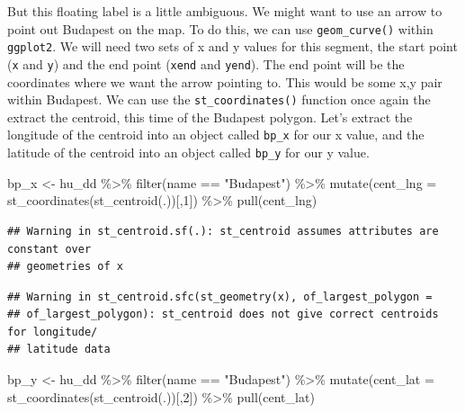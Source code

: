 \documentclass[
]{book}
\newenvironment{Shaded}{\begin{snugshade}}{\end{snugshade}}
\newcommand{\AttributeTok}[1]{\textcolor[rgb]{0.77,0.63,0.00}{#1}}
\newcommand{\DecValTok}[1]{\textcolor[rgb]{0.00,0.00,0.81}{#1}}
\newcommand{\FunctionTok}[1]{\textcolor[rgb]{0.00,0.00,0.00}{#1}}
\newcommand{\NormalTok}[1]{#1}
\newcommand{\OtherTok}[1]{\textcolor[rgb]{0.56,0.35,0.01}{#1}}
\newcommand{\SpecialCharTok}[1]{\textcolor[rgb]{0.00,0.00,0.00}{#1}}
\newcommand{\StringTok}[1]{\textcolor[rgb]{0.31,0.60,0.02}{#1}}
\begin{document}
But this floating label is a little ambiguous. We might want to use an arrow to point out Budapest on the map. To do this, we can use \texttt{geom\_curve()} within \texttt{ggplot2}. We will need two sets of x and y values for this segment, the start point (\texttt{x} and \texttt{y}) and the end point (\texttt{xend} and \texttt{yend}). The end point will be the coordinates where we want the arrow pointing to. This would be some x,y pair within Budapest. We can use the \texttt{st\_coordinates()} function once again the extract the centroid, this time of the Budapest polygon. Let's extract the longitude of the centroid into an object called \texttt{bp\_x} for our x value, and the latitude of the centroid into an object called \texttt{bp\_y} for our y value.

\begin{Shaded}
\begin{Highlighting}[]
\NormalTok{bp\_x }\OtherTok{\textless{}{-}}\NormalTok{ hu\_dd }\SpecialCharTok{\%\textgreater{}\%} \FunctionTok{filter}\NormalTok{(name }\SpecialCharTok{==} \StringTok{"Budapest"}\NormalTok{) }\SpecialCharTok{\%\textgreater{}\%} 
  \FunctionTok{mutate}\NormalTok{(}\AttributeTok{cent\_lng =} \FunctionTok{st\_coordinates}\NormalTok{(}\FunctionTok{st\_centroid}\NormalTok{(.))[,}\DecValTok{1}\NormalTok{]) }\SpecialCharTok{\%\textgreater{}\%} 
  \FunctionTok{pull}\NormalTok{(cent\_lng)}
\end{Highlighting}
\end{Shaded}

\begin{verbatim}
## Warning in st_centroid.sf(.): st_centroid assumes attributes are constant over
## geometries of x
\end{verbatim}

\begin{verbatim}
## Warning in st_centroid.sfc(st_geometry(x), of_largest_polygon =
## of_largest_polygon): st_centroid does not give correct centroids for longitude/
## latitude data
\end{verbatim}

\begin{Shaded}
\begin{Highlighting}[]
\NormalTok{bp\_y }\OtherTok{\textless{}{-}}\NormalTok{ hu\_dd }\SpecialCharTok{\%\textgreater{}\%} \FunctionTok{filter}\NormalTok{(name }\SpecialCharTok{==} \StringTok{"Budapest"}\NormalTok{) }\SpecialCharTok{\%\textgreater{}\%} 
  \FunctionTok{mutate}\NormalTok{(}\AttributeTok{cent\_lat =} \FunctionTok{st\_coordinates}\NormalTok{(}\FunctionTok{st\_centroid}\NormalTok{(.))[,}\DecValTok{2}\NormalTok{]) }\SpecialCharTok{\%\textgreater{}\%} 
  \FunctionTok{pull}\NormalTok{(cent\_lat)}
\end{Highlighting}
\end{Shaded}
\end{document}
